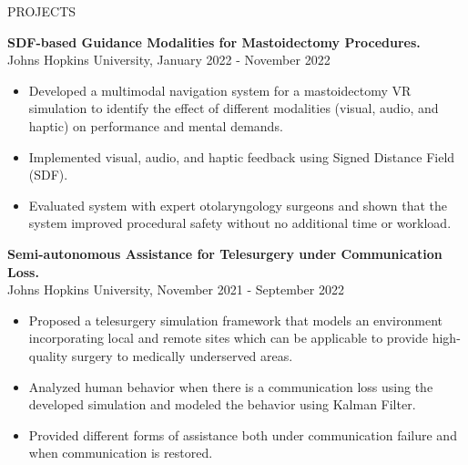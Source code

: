 \documentclass{resume} %
\begin{document}
\begin{rSection}{PROJECTS}
\vspace{-1.25em}
\item \textbf{SDF-based Guidance Modalities for
Mastoidectomy Procedures.}\\
Johns Hopkins University, January 2022 - November 2022
\begin{itemize}
\itemsep -3pt {} 
\item Developed a multimodal navigation system for a mastoidectomy VR simulation to identify the effect of different modalities (visual, audio, and haptic) on performance and mental demands.
    \item Implemented visual, audio, and haptic feedback using Signed Distance Field (SDF).
    \item Evaluated system with expert otolaryngology surgeons and shown that the system improved procedural safety without no additional time or workload.
\end{itemize}
\item \textbf{Semi-autonomous Assistance for Telesurgery
under Communication Loss.}\\
Johns Hopkins University, November 2021 - September 2022

\begin{itemize}
\itemsep -3pt {} 
    \item Proposed a telesurgery simulation framework that models an environment incorporating local and remote sites which can be applicable to provide high-quality surgery to medically underserved areas.
    \item Analyzed human behavior when there is a communication loss using the developed simulation and modeled the behavior using Kalman Filter.
    \item Provided different forms of assistance both under communication failure and when communication is restored. 
    

\end{itemize}
\end{rSection}
\end{document}
